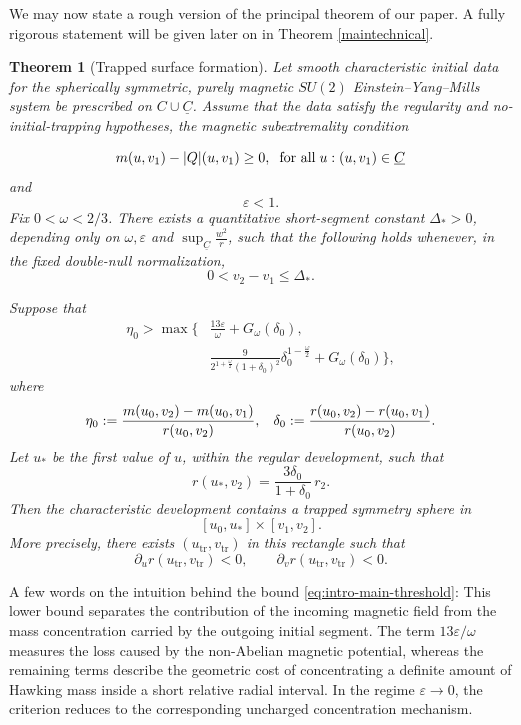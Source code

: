 \documentclass{article}[11pt]
\newcommand{\hsp}{\hspace{.5mm}}
\newcommand{\Cbar}{\underline{C}}
\newtheorem{theorem}{Theorem}[section]
\numberwithin{equation}{section}
\begin{document}
\noindent We may now state a rough version of the principal theorem of our paper. A fully rigorous statement will be given later on in Theorem \ref{maintechnical}.

\begin{theorem}[Trapped surface formation]
\label{thm:intro-main}
Let smooth characteristic initial data for the spherically symmetric,
purely magnetic \(SU(2)\) Einstein--Yang--Mills system be prescribed on
\(C\cup\underline C\). Assume that the data satisfy the regularity and no-initial-trapping hypotheses, the \textit{magnetic
subextremality} condition

\[m(u,v_1) -\lvert Q\rvert(u,v_1) \geq 0, \hspace{2mm} \text{for all} \hsp \hsp u: (u,v_1)\in \Cbar \]
 \noindent and
\[
    \varepsilon<1.
\]
Fix \(0<\omega<2/3\). There exists a quantitative short-segment constant
\(\Delta_*>0\), depending only on $\omega, \varepsilon$ and $\sup_{\Cbar} \frac{w^2}{r}$, such that the following holds
whenever, in the fixed double-null normalization,
\[
    0<v_2-v_1\leq\Delta_*.
\]

\noindent Suppose that
\begin{equation}
\begin{split}
    \eta_0
    >
    \max\Bigg\{
       &\frac{13\varepsilon}{\omega}
        +G_\omega(\delta_0),
        \\
       &\frac{9}
       {2^{1+\frac{\omega}{2}}
        (1+\delta_0)^2}
        \delta_0^{1-\frac{\omega}{2}}
        +G_\omega(\delta_0)
    \Bigg\},
\end{split}
\label{eq:intro-main-threshold}
\end{equation}where \[ \eta_0 := \frac{m(u_0,v_2)-m(u_0,v_1)}{r(u_0,v_2)}, \hspace{3mm} \delta_0 := \frac{r(u_0,v_2)-r(u_0,v_1)}{r(u_0,v_2)}.  \]
Let \(u_*\) be the first value of \(u\), within the regular development,
such that
\begin{equation}
    r(u_*,v_2)
    =
    \frac{3\delta_0}{1+\delta_0}\,r_2.
    \label{eq:intro-u-star}
\end{equation}
Then the characteristic development contains a trapped symmetry sphere
in
\[
    [u_0,u_*]\times[v_1,v_2].
\]
More precisely, there exists
\((u_{\mathrm{tr}},v_{\mathrm{tr}})\) in this rectangle such that
\[
    \partial_u r(u_{\mathrm{tr}},v_{\mathrm{tr}})<0,
    \qquad
    \partial_v r(u_{\mathrm{tr}},v_{\mathrm{tr}})<0.
\]
\end{theorem}

\noindent A few words on the intuition behind the bound \eqref{eq:intro-main-threshold}: This lower bound separates the contribution
of the incoming magnetic field from the mass concentration carried by the
outgoing initial segment. The term \(13\varepsilon/\omega\) measures the
loss caused by the non-Abelian magnetic potential, whereas the remaining
terms describe the geometric cost of concentrating a definite amount of
Hawking mass inside a short relative radial interval. In the regime
\(\varepsilon\to0\), the criterion reduces to the corresponding
uncharged concentration mechanism.
\end{document}
